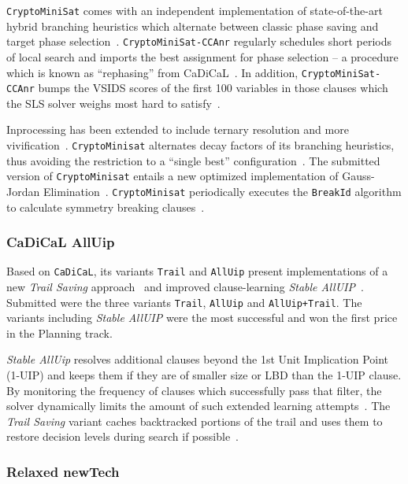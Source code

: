 \documentclass{elsarticle}
\newcommand{\solver}[1]{\texttt{#1}}
\begin{document}
\solver{CryptoMiniSat} comes with an independent implementation of state-of-the-art hybrid branching heuristics which alternate between classic phase saving and target phase selection~\cite{Biere:SC2019}.
\solver{CryptoMiniSat-CCAnr} regularly schedules short periods of local search and imports the best assignment for phase selection -- a procedure which is known as ``rephasing'' from CaDiCaL~\cite{Biere:SC2019}.
In addition, \solver{CryptoMiniSat-CCAnr} bumps the VSIDS scores of the first 100 variables in those clauses which the SLS solver weighs most hard to satisfy~\cite{Soos:SC2020}.

Inprocessing has been extended to include ternary resolution and more vivification~\cite{ChuMinLi:2020:Vivification}. 
\solver{CryptoMinisat} alternates decay factors of its branching heuristics, thus avoiding the restriction to a ``single best'' configuration~\cite{Soos:SC2020}. 
The submitted version of \solver{CryptoMinisat} entails a new optimized implementation of Gauss-Jordan Elimination~\cite{Soos:2020:CNFXOR}. 
\solver{CryptoMinisat} periodically executes the \solver{BreakId} algorithm to  calculate symmetry breaking clauses~\cite{Devriendt:2016:BreakId}.


\subsubsection{CaDiCaL AllUip}

Based on \solver{CaDiCaL}, its variants \solver{Trail} and \solver{AllUip} present implementations of a new \emph{Trail Saving} approach~\cite{Hickey:2020:TrailSaving} and improved clause-learning \emph{Stable AllUIP}~\cite{Bacchus:SC2020}. 
Submitted were the three variants \solver{Trail}, \solver{AllUip} and \solver{AllUip+Trail}. 
The variants including \emph{Stable AllUIP} were the most successful and won the first price in the Planning track. 

\emph{Stable AllUip} resolves additional clauses beyond the 1st Unit Implication Point (1-UIP) and keeps them if they are of smaller size or LBD than the 1-UIP clause. 
By monitoring the frequency of clauses which successfully pass that filter, the solver dynamically limits the amount of such extended learning attempts~\cite{Zhang:2001:ClauseLearning,Bacchus:SC2020}.
The \emph{Trail Saving} variant caches backtracked portions of the trail and uses them to restore decision levels during search if possible~\cite{Hickey:2020:TrailSaving}. 


\subsubsection{Relaxed newTech}
\end{document}
